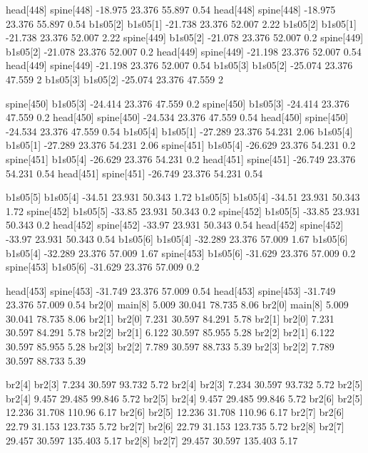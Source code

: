 head[448]    spine[448]    -18.975    23.376    55.897    0.54
head[448]    spine[448]    -18.975    23.376    55.897    0.54
b1s05[2]    b1s05[1]    -21.738    23.376    52.007    2.22
b1s05[2]    b1s05[1]    -21.738    23.376    52.007    2.22
spine[449]    b1s05[2]    -21.078    23.376    52.007    0.2
spine[449]    b1s05[2]    -21.078    23.376    52.007    0.2
head[449]    spine[449]    -21.198    23.376    52.007    0.54
head[449]    spine[449]    -21.198    23.376    52.007    0.54
b1s05[3]    b1s05[2]    -25.074    23.376    47.559    2
b1s05[3]    b1s05[2]    -25.074    23.376    47.559    2


spine[450]    b1s05[3]    -24.414    23.376    47.559    0.2
spine[450]    b1s05[3]    -24.414    23.376    47.559    0.2
head[450]    spine[450]    -24.534    23.376    47.559    0.54
head[450]    spine[450]    -24.534    23.376    47.559    0.54
b1s05[4]    b1s05[1]    -27.289    23.376    54.231    2.06
b1s05[4]    b1s05[1]    -27.289    23.376    54.231    2.06
spine[451]    b1s05[4]    -26.629    23.376    54.231    0.2
spine[451]    b1s05[4]    -26.629    23.376    54.231    0.2
head[451]    spine[451]    -26.749    23.376    54.231    0.54
head[451]    spine[451]    -26.749    23.376    54.231    0.54


b1s05[5]    b1s05[4]    -34.51    23.931    50.343    1.72
b1s05[5]    b1s05[4]    -34.51    23.931    50.343    1.72
spine[452]    b1s05[5]    -33.85    23.931    50.343    0.2
spine[452]    b1s05[5]    -33.85    23.931    50.343    0.2
head[452]    spine[452]    -33.97    23.931    50.343    0.54
head[452]    spine[452]    -33.97    23.931    50.343    0.54
b1s05[6]    b1s05[4]    -32.289    23.376    57.009    1.67
b1s05[6]    b1s05[4]    -32.289    23.376    57.009    1.67
spine[453]    b1s05[6]    -31.629    23.376    57.009    0.2
spine[453]    b1s05[6]    -31.629    23.376    57.009    0.2


head[453]    spine[453]    -31.749    23.376    57.009    0.54
head[453]    spine[453]    -31.749    23.376    57.009    0.54
br2[0]    main[8]    5.009    30.041    78.735    8.06
br2[0]    main[8]    5.009    30.041    78.735    8.06
br2[1]    br2[0]    7.231    30.597    84.291    5.78
br2[1]    br2[0]    7.231    30.597    84.291    5.78
br2[2]    br2[1]    6.122    30.597    85.955    5.28
br2[2]    br2[1]    6.122    30.597    85.955    5.28
br2[3]    br2[2]    7.789    30.597    88.733    5.39
br2[3]    br2[2]    7.789    30.597    88.733    5.39


br2[4]    br2[3]    7.234    30.597    93.732    5.72
br2[4]    br2[3]    7.234    30.597    93.732    5.72
br2[5]    br2[4]    9.457    29.485    99.846    5.72
br2[5]    br2[4]    9.457    29.485    99.846    5.72
br2[6]    br2[5]    12.236    31.708    110.96    6.17
br2[6]    br2[5]    12.236    31.708    110.96    6.17
br2[7]    br2[6]    22.79    31.153    123.735    5.72
br2[7]    br2[6]    22.79    31.153    123.735    5.72
br2[8]    br2[7]    29.457    30.597    135.403    5.17
br2[8]    br2[7]    29.457    30.597    135.403    5.17


